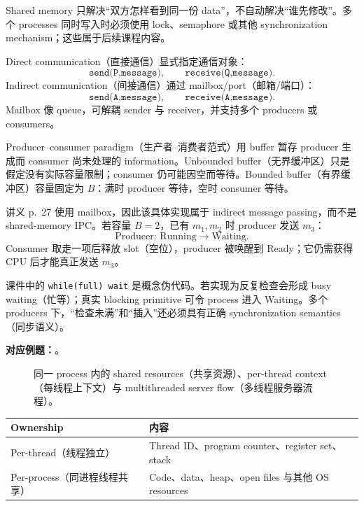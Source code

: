 Shared memory 只解决“双方怎样看到同一份 data”，不自动解决“谁先修改”。多个 processes 同时写入时必须使用 lock、semaphore 或其他 synchronization mechanism；这些属于后续课程内容。


Direct communication（直接通信）显式指定通信对象：
\[
  \texttt{send(P,message)},\qquad \texttt{receive(Q,message)}.
\]
Indirect communication（间接通信）通过 mailbox/port（邮箱/端口）：
\[
  \texttt{send(A,message)},\qquad \texttt{receive(A,message)}.
\]
Mailbox 像 queue，可解耦 sender 与 receiver，并支持多个 producers 或 consumers。

Producer--consumer paradigm（生产者--消费者范式）用 buffer 暂存 producer 生成而 consumer 尚未处理的 information。Unbounded buffer（无界缓冲区）只是假定没有实际容量限制；consumer 仍可能因空而等待。Bounded buffer（有界缓冲区）容量固定为 $B$：满时 producer 等待，空时 consumer 等待。

讲义 p.~27 使用 mailbox，因此该具体实现属于 indirect message passing，而不是 shared-memory IPC。若容量 $B=2$，已有 $m_1,m_2$ 时 producer 发送 $m_3$：
\[
  \text{Producer: Running}\rightarrow\text{Waiting}.
\]
Consumer 取走一项后释放 slot（空位），producer 被唤醒到 Ready；它仍需获得 CPU 后才能真正发送 $m_3$。

课件中的 \texttt{while(full) wait} 是概念伪代码。若实现为反复检查会形成 busy waiting（忙等）；真实 blocking primitive 可令 process 进入 Waiting。多个 producers 下，“检查未满”和“插入”还必须具有正确 synchronization semantics（同步语义）。

\textbf{对应例题：}。



\begin{figure}[htbp]
  \centering
  \resizebox{0.98\textwidth}{!}{}
  \caption{同一 process 内的 shared resources（共享资源）、per-thread context（每线程上下文）与 multithreaded server flow（多线程服务器流程）。}
  \label{fig:sc2005-l04-thread-resources}
\end{figure}

\begin{center}
\small
\begin{tabularx}{0.96\textwidth}{@{}>{\raggedright\arraybackslash}p{3.4cm}X@{}}
  \toprule
  Ownership & 内容 \\
  \midrule
  Per-thread（线程独立） & Thread ID、program counter、register set、stack \\
  Per-process（同进程线程共享） & Code、data、heap、open files 与其他 OS resources \\
  \bottomrule
\end{tabularx}
\end{center}


